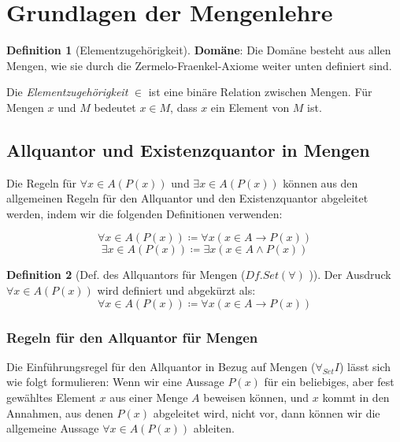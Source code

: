 \documentclass{book}
\theoremstyle{plain}
\theoremstyle{remark}
\theoremstyle{definition}
\newtheorem{definition}{Definition}[section]
\begin{document}
\section{Grundlagen der Mengenlehre}

\begin{definition}[Elementzugehörigkeit]
    \textbf{Domäne}: Die Domäne besteht aus allen Mengen, wie sie durch die Zermelo-Fraenkel-Axiome weiter unten definiert sind.
    
    Die \emph{Elementzugehörigkeit} \( \in \) ist eine binäre Relation zwischen Mengen. Für Mengen \( x \) und \( M \) bedeutet \( x \in M \), dass \( x \) ein Element von \( M \) ist.
\end{definition}

\subsection{Allquantor und Existenzquantor in Mengen}

Die Regeln für \(\forall x \in A(P(x))\) und \(\exists x \in A(P(x))\) können aus den allgemeinen Regeln für den Allquantor und den Existenzquantor abgeleitet werden, indem wir die folgenden Definitionen verwenden:

\[
\forall x \in A(P(x)) \coloneqq \forall x(x \in A \rightarrow P(x))
\]
\[
\exists x \in A(P(x)) \coloneqq \exists x(x \in A \wedge P(x))
\]

\begin{definition}[Def. des Allquantors für Mengen ($Df. Set(\forall)$ )]
	Der Ausdruck \(\forall x \in A(P(x))\) wird definiert und abgekürzt als:
	\[
	\forall x \in A(P(x)) \coloneqq\forall x(x \in A \rightarrow P(x))
	\]
\end{definition}
\label{rule:rSetU} 

\subsubsection{Regeln für den Allquantor für Mengen}
\label{rule:rSetUI} \label{rule:rSetUE}

Die Einführungsregel für den Allquantor in Bezug auf Mengen (\(\forall_{Set} I\)) lässt sich wie folgt formulieren:
Wenn wir eine Aussage \(P(x)\) für ein beliebiges, aber fest gewähltes Element \(x\) aus einer Menge \(A\) beweisen können, und \(x\) kommt in den Annahmen, aus denen \(P(x)\) abgeleitet wird, nicht vor, dann können wir die allgemeine Aussage \(\forall x \in A(P(x))\) ableiten.
\end{document}
